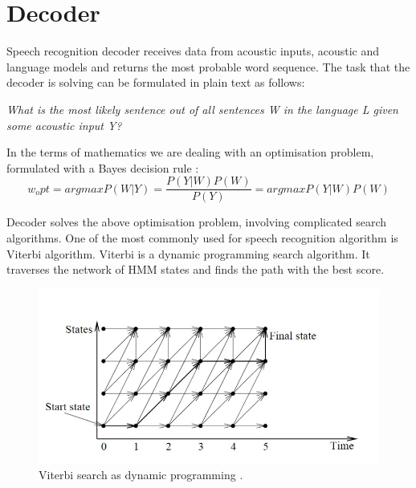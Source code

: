  
\section {Decoder}
Speech recognition decoder receives data from acoustic inputs, acoustic and
language models and returns the most probable word sequence. The task that the decoder is solving can be
formulated in plain text as follows:
\begin {center}
\textit {What is the most likely sentence out of all
sentences W in the language L given some acoustic input Y? }
\end {center}
In the terms of mathematics we are dealing with an optimisation problem,
formulated with a Bayes decision rule \parencite {jurafskymartin2009}:
\[w_opt = argmax P(W|Y ) = \frac {P(Y |W)P(W)} {P(Y)} = argmax P(Y |W)P(W)\]

Decoder solves the above optimisation problem, involving complicated search algorithms. One of the most commonly used for speech recognition algorithm is 
Viterbi algorithm. Viterbi is a dynamic programming search algorithm. It traverses the network of HMM states and 
finds the path with the best score.

\begin{figure}[htbp]
  \centering
    \includegraphics[width=1.0\textwidth]{images/viterbi.png}
 \caption{Viterbi search as dynamic programming \parencite
{Ravishankar96efficientalgorithms}.}
  \label{fig:hmm}
\end {figure}

